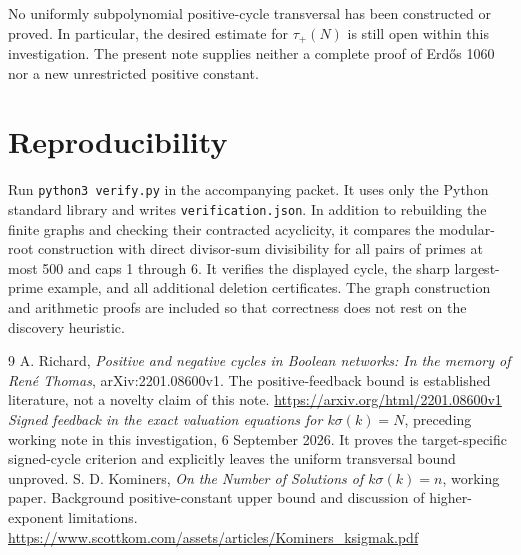 \documentclass[11pt]{article}
\begin{document}
No uniformly subpolynomial positive-cycle transversal has been constructed or proved. In particular, the desired estimate for $\tau_+(N)$ is still open within this investigation. The present note supplies neither a complete proof of Erd\H{o}s 1060 nor a new unrestricted positive constant.

\section*{Reproducibility}
Run \texttt{python3 verify.py} in the accompanying packet. It uses only the Python standard library and writes \texttt{verification.json}. In addition to rebuilding the finite graphs and checking their contracted acyclicity, it compares the modular-root construction with direct divisor-sum divisibility for all pairs of primes at most 500 and caps 1 through 6. It verifies the displayed cycle, the sharp largest-prime example, and all additional deletion certificates. The graph construction and arithmetic proofs are included so that correctness does not rest on the discovery heuristic.

\begin{thebibliography}{9}
 A. Richard, \emph{Positive and negative cycles in Boolean networks: In the memory of Ren\'e Thomas}, arXiv:2201.08600v1. The positive-feedback bound is established literature, not a novelty claim of this note.\newline
\url{https://arxiv.org/html/2201.08600v1}
 \emph{Signed feedback in the exact valuation equations for $k\sigma(k)=N$}, preceding working note in this investigation, 6 September 2026. It proves the target-specific signed-cycle criterion and explicitly leaves the uniform transversal bound unproved.
 S. D. Kominers, \emph{On the Number of Solutions of $k\sigma(k)=n$}, working paper. Background positive-constant upper bound and discussion of higher-exponent limitations.\newline
\url{https://www.scottkom.com/assets/articles/Kominers_ksigmak.pdf}
\end{thebibliography}
\end{document}
